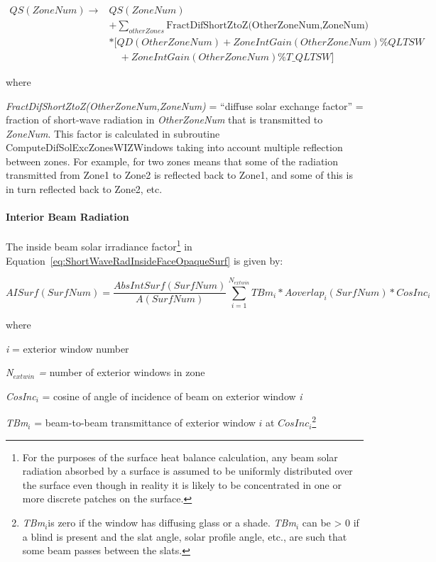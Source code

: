 \begin{equation}
\begin{array}{rl}
   QS(ZoneNum) \to & QS(ZoneNum) \\
                   &+ \sum_{otherZones}\text{FractDifShortZtoZ(OtherZoneNum,ZoneNum)} \\
                   &* [QD(OtherZoneNum) + ZoneIntGain(OtherZoneNum)\% QLTSW \\
                   &\quad + ZoneIntGain(OtherZoneNum)\% T\_QLTSW]
  \end{array}
\end{equation}

where

\emph{FractDifShortZtoZ(OtherZoneNum,ZoneNum)} = ``diffuse solar exchange factor'' = fraction of short-wave radiation in \emph{OtherZoneNum} that is transmitted to \emph{ZoneNum}. This factor is calculated in subroutine ComputeDifSolExcZonesWIZWindows taking into account multiple reflection between zones. For example, for two zones means that some of the radiation transmitted from Zone1 to Zone2 is reflected back to Zone1, and some of this is in turn reflected back to Zone2, etc.

\paragraph{Interior Beam Radiation}\label{interior-beam-radiation}

The inside beam solar irradiance factor\footnote{For the purposes of the surface heat balance calculation, any beam solar radiation absorbed by a surface is assumed to be uniformly distributed over the surface even though in reality it is likely to be concentrated in one or more discrete patches on the surface.} in Equation~\ref{eq:ShortWaveRadInsideFaceOpaqueSurf} is given by:

\begin{equation}
AISurf(SurfNum) = \frac{{AbsIntSurf(SurfNum)}}{{A(SurfNum)}}\sum\limits_{i = 1}^{{N_{extwin}}} {TB{m_i}*Aoverla{p_i}(SurfNum)*CosIn{c_i}}
\end{equation}

where

\emph{i} = exterior window number

\emph{N\(_{extwin}\) =} number of exterior windows in zone

\emph{CosInc\(_{i}\)} = cosine of angle of incidence of beam on exterior window \emph{i}

\emph{TBm\(_{i}\)} = beam-to-beam transmittance of exterior window \(i\) at \(CosInc_{i}\)\footnote{\emph{TBm\(_{i}\)}is zero if the window has diffusing glass or a shade. \emph{TBm\(_{i}\)} can be \textgreater{} 0 if a blind is present and the slat angle, solar profile angle, etc., are such that some beam passes between the slats.}

